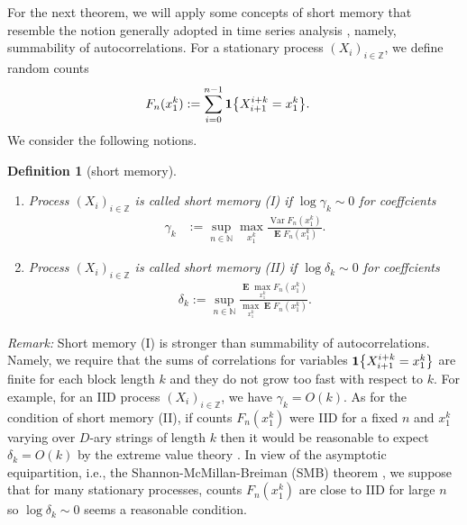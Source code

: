 \documentclass[a4paper,12pt]{article}
\newcommand{\klam}[1]{\left\{ #1 \right\}}
\DeclareMathOperator{\var}{Var}
\DeclareMathOperator{\mean}{\mathbf{E}}
\newcommand{\boole}[1]{{\bf 1}{\klam{#1}}}
\newtheorem{definition}{Definition}
\begin{document}
For the next theorem, we will apply some concepts of short memory that
resemble the notion generally adopted in time series analysis
\cite{Beran94}, namely, summability of autocorrelations.  For a
stationary process $(X_i)_{i\in\mathbb{Z}}$, we define random counts
\begin{align}
  F_n(x_1^k)&:=\sum_{i=0}^{n-1}\boole{X_{i+1}^{i+k}=x_1^k}.
\end{align}
We consider the following notions.
\begin{definition}[short memory]
  \mbox{}
  \begin{enumerate}
  \item Process $(X_i)_{i\in\mathbb{Z}}$ is called short
    memory (I) if $\log \gamma_k\sim 0$ for coeffcients
    \begin{align}
      \label{Gamma}
      \gamma_k&:=\sup_{n\in\mathbb{N}}\max_{x_1^k}
                \frac{\var F_n(x_1^k)}{\mean F_n(x_1^k)}.
    \end{align}
  \item Process $(X_i)_{i\in\mathbb{Z}}$ is called short memory (II)
    if $\log \delta_k\sim 0$ for coeffcients
    \begin{align}
    \label{Delta}
      \delta_k:=
      \sup_{n\in\mathbb{N}}\frac{\mean\max_{x_1^k}
      F_n(x_1^k)}{\max_{x_1^k}\mean F_n(x_1^k)}.
    \end{align}
  \end{enumerate}
\end{definition}
\emph{Remark:} Short memory (I) is stronger than summability of
autocorrelations.  Namely, we require that the sums of correlations
for variables $\boole{X_{i+1}^{i+k}=x_1^k}$ are finite for each block
length $k$ and they do not grow too fast with respect to $k$.  For
example, for an IID process $(X_i)_{i\in\mathbb{Z}}$, we have
$\gamma_k=O(k)$. As for the condition of short memory (II), if counts
$F_n(x_1^k)$ were IID for a fixed $n$ and $x_1^k$ varying over $D$-ary
strings of length $k$ then it would be reasonable to expect
$\delta_k=O(k)$ by the extreme value theory \citep{HaanFereira06}.  In
view of the asymptotic equipartition, i.e., the
Shannon-McMillan-Breiman (SMB) theorem \citep{Shannon48, Breiman57,
  Chung61, Barron85, AlgoetCover88}, we suppose that for many
stationary processes, counts $F_n(x_1^k)$ are close to IID for large
$n$ so $\log \delta_k\sim 0$ seems a reasonable condition.
\end{document}
